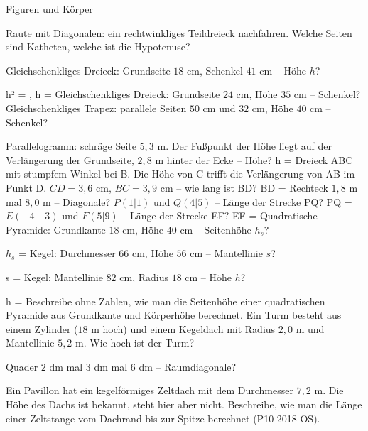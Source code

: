 \begin{aufgabe}{Figuren und Körper}
\begin{teile}
\teil Raute mit Diagonalen: ein rechtwinkliges Teildreieck nachfahren. Welche Seiten sind Katheten, welche ist die Hypotenuse?

\teil Gleichschenkliges Dreieck: Grundseite $18$ cm, Schenkel $41$ cm – Höhe $h$?

h² = \leerfeld , h = \leerfeld[cm]
\teil Gleichschenkliges Dreieck: Grundseite $24$ cm, Höhe $35$ cm – Schenkel? \leerfeld[cm]
\teil Gleichschenkliges Trapez: parallele Seiten $50$ cm und $32$ cm, Höhe $40$ cm – Schenkel?

\leerfeld[cm]
\teil Parallelogramm: schräge Seite $5{,}3$ m. Der Fußpunkt der Höhe liegt auf der Verlängerung der Grundseite, $2{,}8$ m hinter der Ecke – Höhe? h = \leerfeld[m]
\teil Dreieck ABC mit stumpfem Winkel bei B. Die Höhe von C trifft die Verlängerung von AB im Punkt D. $CD = 3{,}6$ cm, $BC = 3{,}9$ cm – wie lang ist BD? BD = \leerfeld[cm]
\teil Rechteck $1{,}8$ m mal $8{,}0$ m – Diagonale? \leerfeld[m]
\teil $P(1 | 1)$ und $Q(4 | 5)$ – Länge der Strecke PQ? PQ = \leerfeld
\teil $E(-4 | -3)$ und $F(5 | 9)$ – Länge der Strecke EF? EF = \leerfeld
\teil Quadratische Pyramide: Grundkante $18$ cm, Höhe $40$ cm – Seitenhöhe $h_s$?

$h_s$ = \leerfeld[cm]
\teil Kegel: Durchmesser $66$ cm, Höhe $56$ cm – Mantellinie $s$?

s = \leerfeld[cm]
\teil Kegel: Mantellinie $82$ cm, Radius $18$ cm – Höhe $h$?

h = \leerfeld[cm]
\teil Beschreibe ohne Zahlen, wie man die Seitenhöhe einer quadratischen Pyramide aus Grundkante und Körperhöhe berechnet.
\teil Ein Turm besteht aus einem Zylinder ($18$ m hoch) und einem Kegeldach mit Radius $2{,}0$ m und Mantellinie $5{,}2$ m. Wie hoch ist der Turm?

\leerfeld[m]
\teil Quader $2$ dm mal $3$ dm mal $6$ dm – Raumdiagonale?

\leerfeld[dm]
\teil Ein Pavillon hat ein kegelförmiges Zeltdach mit dem Durchmesser $7{,}2$ m. Die Höhe des Dachs ist bekannt, steht hier aber nicht. Beschreibe, wie man die Länge einer Zeltstange vom Dachrand bis zur Spitze berechnet \hfill (P10 2018 OS).


\end{teile}
\end{aufgabe}
